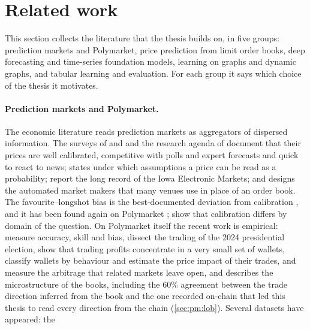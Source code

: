 \section{Related work}
\label{sec:bg:related}
\label{sec:pm:related}

This section collects the literature that the thesis builds on, in five groups: prediction
markets and Polymarket, price prediction from limit order books, deep forecasting and
time-series foundation models, learning on graphs and dynamic graphs, and tabular learning
and evaluation.  For each group it says which choice of the thesis it motivates.

\paragraph{Prediction markets and Polymarket.}  The economic literature reads prediction
markets as aggregators of dispersed information.  The surveys of \textcite{wolfers2004prediction}
and \textcite{snowberg2012prediction} and the research agenda of \textcite{arrow2008promise}
document that their prices are well calibrated, competitive with polls and expert forecasts
and quick to react to news; \textcite{manski2006interpreting} states under which assumptions
a price can be read as a probability; \textcite{berg2008iem} report the long record of the
Iowa Electronic Markets; and \textcite{hanson2003mcr,hanson2007lmsr} designs the automated
market makers that many venues use in place of an order book.  The favourite--longshot bias
is the best-documented deviation from calibration \cite{page2013calibrated}, and it has been
found again on Polymarket \cite{cardozo2026favorite}; \textcite{le2026calibration} show that
calibration differs by domain of the question.  On Polymarket itself the recent work is
empirical: \textcite{reichenbach2025exploring} measure accuracy, skill and bias,
\textcite{tsang2026anatomy} dissect the trading of the 2024 presidential election,
\textcite{akey2026whowins} show that trading profits concentrate in a very small set of
wallets, \textcite{bsic2026polymarket} classify wallets by behaviour and estimate the price
impact of their trades, \textcite{saguillo2025unravelling} and \textcite{gebele2026arbitrage}
measure the arbitrage that related markets leave open, and \textcite{dubach2026anatomy}
describes the microstructure of the books, including the 60\% agreement between the trade
direction inferred from the book and the one recorded on-chain that led this thesis to read
every direction from the chain (\cref{sec:pm:lob}).  Several datasets have appeared: the
